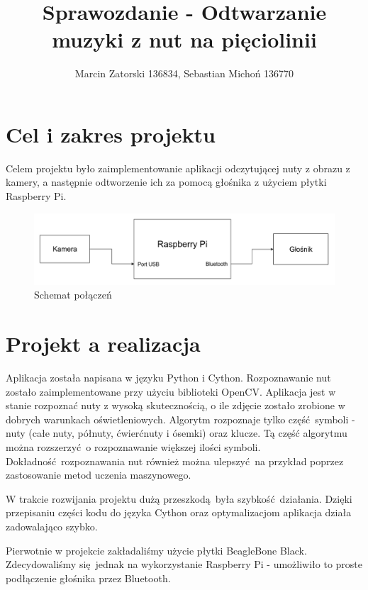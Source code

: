 \documentclass[12pt]{article}
\begin{document}
\title{Sprawozdanie - Odtwarzanie muzyki z nut na pięciolinii}
\author{Marcin Zatorski 136834, Sebastian Michoń 136770}
\date{\vspace{-2ex}}
\maketitle

\section{Cel i zakres projektu}
Celem projektu było zaimplementowanie aplikacji odczytującej nuty z obrazu z kamery, a następnie odtworzenie ich za pomocą głośnika z użyciem płytki Raspberry Pi.

\begin{figure}[h!]
	\centering
	\includegraphics[width=0.9\linewidth]{SW-schematic.png}
	\caption{Schemat połączeń}
	\label{fig:schemat}
\end{figure}
	
\section{Projekt a realizacja}
Aplikacja została napisana w języku Python i Cython. Rozpoznawanie nut zostało zaimplementowane przy użyciu biblioteki OpenCV. Aplikacja jest w stanie rozpoznać nuty z wysoką skutecznością, o ile zdjęcie zostało zrobione w dobrych warunkach oświetleniowych. Algorytm rozpoznaje tylko część symboli - nuty (całe nuty, półnuty, ćwierćnuty i ósemki) oraz klucze. Tą część algorytmu można rozszerzyć o rozpoznawanie większej ilości symboli. Dokładność rozpoznawania nut również można ulepszyć na przykład poprzez zastosowanie metod uczenia maszynowego.
	
W trakcie rozwijania projektu dużą przeszkodą była szybkość działania. Dzięki przepisaniu części kodu do języka Cython oraz optymalizacjom aplikacja działa zadowalająco szybko.

Pierwotnie w projekcie zakładaliśmy użycie płytki BeagleBone Black. Zdecydowaliśmy się jednak na wykorzystanie Raspberry Pi - umożliwiło to proste podłączenie głośnika przez Bluetooth.
\end{document}
